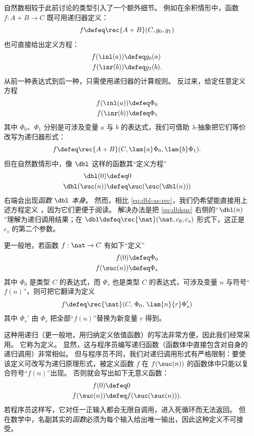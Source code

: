 %
%
%
自然数相较于此前讨论的类型引入了一个额外细节。
例如在余积情形中，函数 $f:A+B\to C$ 既可用递归器定义：
\[ f \defeq \rec{A+B}(C, g_0, g_1) \]
也可直接给出定义方程：
\begin{align*}
  f(\inl(a)) &\defeq g_0(a)\\
  f(\inr(b)) &\defeq g_1(b).
\end{align*}
从前一种表达式到后一种，只需使用递归器的计算规则。
反过来，给定任意定义方程
\begin{align*}
  f(\inl(a)) &\defeq \Phi_0\\
  f(\inr(b)) &\defeq \Phi_1
\end{align*}
其中 $\Phi_0$、$\Phi_1$ 分别是可涉及变量
%
$a$ 与 $b$ 的表达式，我们可借助 $\lambda$-抽象把它们等价改写为递归器形式：
\[ f\defeq \rec{A+B}(C, \lam{a} \Phi_0, \lam{b} \Phi_1).\]
但在自然数情形中，像 $\dbl$ 这样的函数其“定义方程”
\begin{align}
  \dbl(0) &\defeq 0 \label{eq:dbl0}\\
  \dbl(\suc(n)) &\defeq \suc(\suc(\dbl(n)))\label{eq:dblsuc}
\end{align}
右端会出现\emph{函数 $\dbl$ 本身}。
然而，相比 \eqref{eq:dbl-as-rec}，我们仍希望能直接用上述方程定义 \dbl，因为它们更便于阅读。
解决办法是把 \eqref{eq:dblsuc} 右侧的“$\dbl(n)$”理解为递归调用结果；在 $\dbl\defeq \rec{\nat}(\nat,c_0,c_s)$ 形式下，这正是 $c_s$ 的第二个参数。

更一般地，若函数 $f:\nat\to C$ 有如下“定义”
\begin{align*}
  f(0) &\defeq \Phi_0\\
  f(\suc(n)) &\defeq \Phi_s
\end{align*}
其中 $\Phi_0$ 是类型 $C$ 的表达式，而 $\Phi_s$ 也是类型 $C$ 的表达式，可涉及变量 $n$ 与符号“$f(n)$”，则可把它翻译为定义
\[ f \defeq \rec{\nat}(C,\,\Phi_0,\,\lam{n}{r} \Phi_s') \]
其中 $\Phi_s'$ 由 $\Phi_s$ 把全部“$f(n)$”替换为新变量 $r$ 得到。

这种用递归（更一般地，用归纳定义依值函数）的写法非常方便，因此我们经常采用。
它称为定义。
显然，这与程序员编写递归函数（函数体中直接包含对自身的递归调用）非常相似。
但与程序员不同，我们对递归调用形式有严格限制：要使该定义可改写为递归原理形式，被定义函数 $f$ 在 $f(\suc(n))$ 的函数体中只能以复合符号“$f(n)$”出现。
否则就会写出如下无意义函数：
\begin{align*}
  f(0)&\defeq 0\\
  f(\suc(n)) &\defeq f(\suc(\suc(n))).
\end{align*}
若程序员这样写，它对任一正输入都会无限自调用，进入死循环而无法返回。
但在数学中，名副其实的\emph{函数}必须为每个输入给出唯一输出，因此这种定义不可接受。

